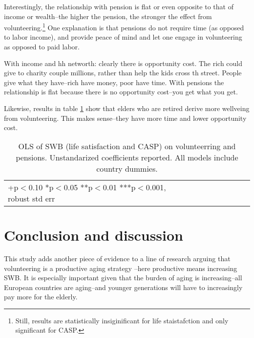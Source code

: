 \documentclass[10pt, letterpaper]{article}
\begin{document}
\begin{spacing}{1.4}
Interestingly,  the
relationship with pension is flat or even opposite to that of income or wealth--the higher the
pension, the stronger the effect from volunteering.\footnote{Still, results are
statistically insiginificant for life staistafction and only significant for CASP.} One explanation is that
pensions do not require time (as opposed to labor income), and provide peace of
mind and let one engage in volunteering as opposed to paid labor. 

With income and hh networth: clearly there is opportunity cost. The rich could give to charity couple
millions, rather than help the kids cross th street. People give what they
have--rich have money, poor have time.  
%
With pensions the relationship is flat because there is no opportunity cost--you
get what you get.



Likewise, results in table \ref{regEw6} show that elders
who are retired derive more wellveing from volunteering. This makes sense--they
have more time and lower opportunity cost. 
%

\begin{spacing}{.9}
\begin{table}[H]\centering \caption{OLS of SWB  (life satisfaction and CASP) on
    volunteerring and pensions.  Unstandarized coefficients reported. All models
  include country dummies.}  \begin{scriptsize} \begin{tabular}{p{1.8in}p{.5in}p{.5in}p{.5in}p{.5in}|p{.5in}p{.5in}p{.5in}p{.5in}p{.5in}p{.4in}p{.5in}p{.4in}}\hline 
      \hline\multicolumn{5}{l}{+p$<$0.10 *p$<$0.05 **p$<$0.01 ***p$<$0.001,
        robust std err} \end{tabular}\label{regEw6} \end{scriptsize}\end{table}
\end{spacing}





\section*{Conclusion and discussion}

This study adds another piece of evidence to a line of research arguing that
volunteering is a productive aging strategy
\citep[e.g.,][]{wilson12B,hank09}--here productive means increasing SWB.
It is especially important given that the burden of aging %
 is increasing--all European countries are aging--and younger generations will
 have to increasingly pay more for the elderly.


\end{spacing}
\end{document}
